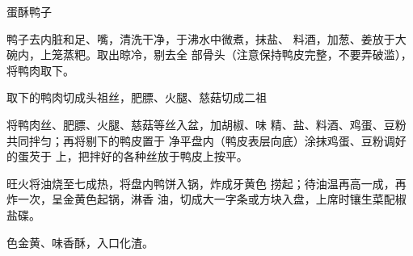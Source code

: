 \begin{recipe}{蛋酥鸭子}

\ingredients


\cooking

\step 	鸭子去内脏和足、嘴，清洗干净，于沸水中微煮，抹盐、 料酒，加葱、姜放于大碗内，上笼蒸粑。取出晾冷，剔去全 部骨头（注意保持鸭皮完整，不要弄破滥），将鸭肉取下。

\step 	取下的鸭肉切成头祖丝，肥膘、火腿、慈菇切成二祖

将鸭肉丝、肥膘、火腿、慈菇等丝入盆，加胡椒、味 精、盐、料酒、鸡蛋、豆粉共同拌匀；再将剔下的鸭皮置于 净平盘内（鸭皮表层向底）涂抹鸡蛋、豆粉调好的蛋芡于 上，把拌好的各种丝放于鸭皮上按平。

\step 旺火将油烧至七成热，将盘内鸭饼入锅，炸成牙黄色 捞起；待油温再高一成，再炸一次，呈金黄色起锅，淋香 油，切成大一字条或方块入盘，上席时镶生菜配椒盐碟。

\notes

色金黄、味香酥，入口化渣。

\end{recipe}

